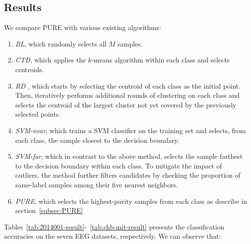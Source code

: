\documentclass[journal,twocolumn]{IEEEtran}
\begin{document}
\subsection{Results}
We compare PURE with various existing algorithms:
\begin{enumerate}
\item \emph{BL}, which randomly selects all $M$ samples.
\item \emph{CTD}, which applies the $k$-means algorithm within each class and selects centroids.
\item \emph{RD} \cite{wu2018pool}, which starts by selecting the centroid of each class as the initial point. Then, iteratively performs additional rounds of clustering on each class and selects the centroid of the largest cluster not yet covered by the previously selected points.
\item \emph{SVM-near}, which trains a SVM classifier on the training set and selects, from each class, the sample closest to the decision boundary.
\item \emph{SVM-far}, which in contrast to the above method, selects the sample farthest to the decision boundary within each class. To mitigate the impact of outliers, the method further filters candidates by checking the proportion of same-label samples among their five nearest neighbors.
\item \emph{PURE}, which selects the highest-purity samples from each class as describe in section~\ref{subsec:PURE}
\end{enumerate}

Tables~\ref{tab:2014001-result}-~\ref{tab:chb-mit-result} presents the classification accuracies on the seven EEG datasets, respectively. We can observe that:
\end{document}
